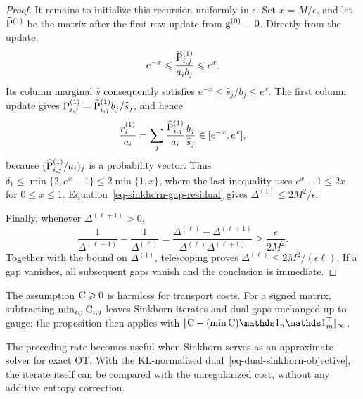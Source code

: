 \begin{proof}
	It remains to initialize this recursion uniformly in $\epsilon$. Set $x=M/\epsilon$, and let $\widehat\P^{(1)}$ be the matrix after the first row update from $\gD^{(0)}=0$. Directly from the update,
	\[
		e^{-x}
		\leq
		\frac{\widehat{\P}^{(1)}_{i,j}}{a_i b_j}
		\leq
		e^x.
	\]
	Its column marginal $\widehat s$ consequently satisfies $e^{-x}\leq \widehat s_j/b_j\leq e^x$. The first column update gives $\P^{(1)}_{i,j}=\widehat{\P}^{(1)}_{i,j}b_j/\widehat s_j$, and hence
	\[
		\frac{r_i^{(1)}}{a_i}
		=
		\sum_j\frac{\widehat{\P}^{(1)}_{i,j}}{a_i}\frac{b_j}{\widehat s_j}
		\in[e^{-x},e^x],
	\]
	because $(\widehat{\P}^{(1)}_{i,j}/a_i)_j$ is a probability vector. Thus $\delta_1\leq\min\{2,e^x-1\}\leq2\min\{1,x\}$, where the last inequality uses $e^x-1\leq2x$ for $0\leq x\leq1$. Equation~\eqref{eq-sinkhorn-gap-residual} gives $\Delta^{(1)}\leq2M^2/\epsilon$.

	Finally, whenever $\Delta^{(\ell+1)}>0$,
	\[
		\frac1{\Delta^{(\ell+1)}}-\frac1{\Delta^{(\ell)}}
		=
		\frac{\Delta^{(\ell)}-\Delta^{(\ell+1)}}{\Delta^{(\ell)}\Delta^{(\ell+1)}}
		\geq
		\frac{\epsilon}{2M^2}.
	\]
	Together with the bound on $\Delta^{(1)}$, telescoping proves $\Delta^{(\ell)}\leq2M^2/(\epsilon\ell)$. If a gap vanishes, all subsequent gaps vanish and the conclusion is immediate.
\end{proof}

The assumption $\C\geq0$ is harmless for transport costs. For a signed matrix, subtracting $\min_{i,j}\C_{i,j}$ leaves Sinkhorn iterates and dual gaps unchanged up to gauge; the proposition then applies with $\norm{\C-(\min\C)\ones_n\ones_m^\top}_\infty$.

The preceding rate becomes useful when Sinkhorn serves as an approximate solver for exact OT\@. With the KL-normalized dual~\eqref{eq-dual-sinkhorn-objective}, the iterate itself can be compared with the unregularized cost, without any additive entropy correction.

